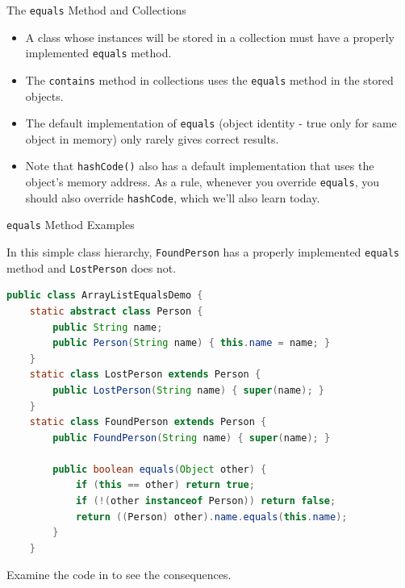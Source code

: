 \documentclass{beamer}
\begin{document}
\begin{frame}[fragile]{The {\tt equals} Method and Collections}



\begin{itemize}
\item A class whose instances will be stored in a collection must have a properly implemented {\tt equals} method.
\item The {\tt contains} method in collections uses the {\tt equals} method in the stored objects.
\item The default implementation of {\tt equals} (object identity - true only for same object in memory) only rarely gives correct results.
\item Note that {\tt hashCode()} also has a default implementation that uses the object's memory address.  As a rule, whenever you override {\tt equals}, you should also override {\tt hashCode}, which we'll also learn today.
\end{itemize}


\end{frame}

\begin{frame}[fragile]{{\tt equals} Method Examples}

\vspace{-.05in}
In this simple class hierarchy, {\tt FoundPerson} has a properly implemented {\tt equals} method and {\tt LostPerson} does not.
\vspace{-.05in}
\begin{lstlisting}[language=Java]
public class ArrayListEqualsDemo {
    static abstract class Person {
        public String name;
        public Person(String name) { this.name = name; }
    }
    static class LostPerson extends Person {
        public LostPerson(String name) { super(name); }
    }
    static class FoundPerson extends Person {
        public FoundPerson(String name) { super(name); }

        public boolean equals(Object other) {
            if (this == other) return true;
            if (!(other instanceof Person)) return false;
            return ((Person) other).name.equals(this.name);
        }
    }
\end{lstlisting}
\vspace{-.05in}
Examine the code in  to see the consequences.

\end{frame}
\end{document}
